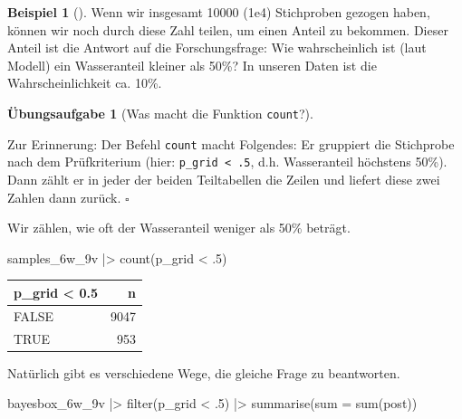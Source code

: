\documentclass[
  ngerman,
  letterpaper,
  twoside,
  open=any]{scrbook}
\newenvironment{Shaded}{\begin{snugshade}}{\end{snugshade}}
\newcommand{\AttributeTok}[1]{\textcolor[rgb]{0.40,0.45,0.13}{#1}}
\newcommand{\DecValTok}[1]{\textcolor[rgb]{0.68,0.00,0.00}{#1}}
\newcommand{\FunctionTok}[1]{\textcolor[rgb]{0.28,0.35,0.67}{#1}}
\newcommand{\NormalTok}[1]{\textcolor[rgb]{0.00,0.23,0.31}{#1}}
\newcommand{\SpecialCharTok}[1]{\textcolor[rgb]{0.37,0.37,0.37}{#1}}
\newcounter{none} %
\theoremstyle{definition}
\newtheorem{example}{Beispiel}[chapter]
\theoremstyle{plain}
\theoremstyle{definition}
\newtheorem{exercise}{Übungsaufgabe}[chapter]
\theoremstyle{definition}
\theoremstyle{remark}
\begin{document}
\begin{example}[]
Wenn wir insgesamt 10000 (1e4) Stichproben gezogen haben, können wir
noch durch diese Zahl teilen, um einen Anteil zu bekommen. Dieser Anteil
ist die Antwort auf die Forschungsfrage: Wie wahrscheinlich ist (laut
Modell) ein Wasseranteil kleiner als 50\%? In unseren Daten ist die
Wahrscheinlichkeit ca. 10\%.

\begin{exercise}[Was macht die Funktion
\texttt{count}?]\protect\hypertarget{exr-count}{}\label{exr-count}

Zur Erinnerung: Der Befehl \texttt{count} macht Folgendes: Er gruppiert
die Stichprobe nach dem Prüfkriterium (hier:
\texttt{p\_grid\ \textless{}\ .5}, d.h. Wasseranteil höchstens 50\%).
Dann zählt er in jeder der beiden Teiltabellen die Zeilen und liefert
diese zwei Zahlen dann zurück. \(\square\)

\end{exercise}

Wir zählen, wie oft der Wasseranteil weniger als 50\% beträgt.

\begin{Shaded}
\begin{Highlighting}[]
\NormalTok{samples\_6w\_9v }\SpecialCharTok{|\textgreater{}}
  \FunctionTok{count}\NormalTok{(p\_grid }\SpecialCharTok{\textless{}}\NormalTok{ .}\DecValTok{5}\NormalTok{) }
\end{Highlighting}
\end{Shaded}

{\def\LTcaptype{none} %
\begin{longtable}[]{@{}lr@{}}
\toprule\noalign{}
p\_grid \textless{} 0.5 & n \\
\midrule\noalign{}
\endhead
\bottomrule\noalign{}
\endlastfoot
FALSE & 9047 \\
TRUE & 953 \\
\end{longtable}
}

Natürlich gibt es verschiedene Wege, die gleiche Frage zu beantworten.

\begin{Shaded}
\begin{Highlighting}[]
\NormalTok{bayesbox\_6w\_9v }\SpecialCharTok{|\textgreater{}}
  \FunctionTok{filter}\NormalTok{(p\_grid }\SpecialCharTok{\textless{}}\NormalTok{ .}\DecValTok{5}\NormalTok{) }\SpecialCharTok{|\textgreater{}}
  \FunctionTok{summarise}\NormalTok{(}\AttributeTok{sum =} \FunctionTok{sum}\NormalTok{(post))}
\end{Highlighting}
\end{Shaded}


\end{example}
\end{document}

